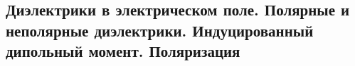 \subsection{Диэлектрики в электрическом поле. Полярные и неполярные диэлектрики. Индуцированный дипольный момент. Поляризация}
